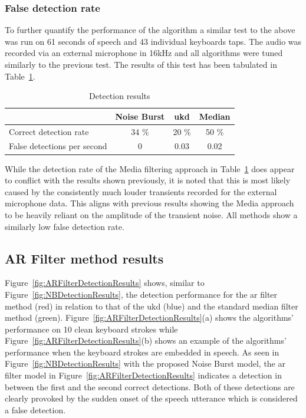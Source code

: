 \subsubsection{False detection rate}
To further quantify the performance of the algorithm a similar test to the above was run on 61 seconds of speech and 43 individual keyboards taps. The audio was recorded via an external microphone in 16kHz and all algorithms were tuned similarly to the previous test. The results of this test has been tabulated in Table~\ref{table:NBResultsTest}.

\begin{table}
\caption{Detection results}
\centering
\begin{tabular}{|l | c c c|}
\hline
                            & Noise Burst   & \gls{ukd}       & Median        \\
 \hline
 Correct detection rate     & 34 \%         & 20 \%     & 50 \%         \\
 False detections per second& 0             & 0.03      & 0.02          \\
 \hline
 \end{tabular}
 \label{table:NBResultsTest}
\end{table}

While the detection rate of the Media filtering approach in Table~\ref{table:NBResultsTest} does appear to conflict with the results shown previously, it is noted that this is most likely caused by the consistently much louder transients recorded for the external microphone data. This aligns with previous results showing the Media approach to be heavily reliant on the amplitude of the transient noise. All methods show a similarly low false detection rate.

\subsection{AR Filter method results}
Figure~\ref{fig:ARFilterDetectionResults} shows, similar to Figure~\ref{fig:NBDetectionResults}, the detection performance for the \gls{ar} filter method (red) in relation to that of the \gls{ukd}\cite{Subramanya2007} (blue) and the standard median filter method (green). Figure~\ref{fig:ARFilterDetectionResults}(a) shows the algorithms' performance on 10 clean keyboard strokes while Figure~\ref{fig:ARFilterDetectionResults}(b) shows an example of the algorithms' performance when the keyboard strokes are embedded in speech. As seen in Figure~\ref{fig:NBDetectionResults} with the proposed Noise Burst model, the \gls{ar} filter model in Figure~\ref{fig:ARFilterDetectionResults} indicates a detection in between the first and the second correct detections. Both of these detections are clearly provoked by the sudden onset of the speech utterance which is considered a false detection.

